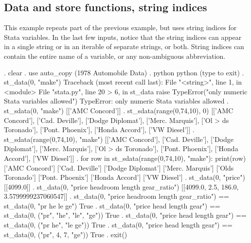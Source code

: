 \documentclass{article}
\begin{document}
\smallskip



\subsection{Data and store functions, string indices} \label{data_and_store_string_example}

This example repeats part of the previous example, but uses string indices for Stata variables. In the last few inputs, notice that the string indices can appear in a single string or in an iterable of separate strings, or both. String indices can contain the entire name of a variable, or any non-ambiguous abbreviation.

\begin{stlog}
. clear
{\smallskip}
. use auto_copy
(1978 Automobile Data)
{\smallskip}
. python
 python (type {} to exit) 
{\bftt{>>>}}. st_data(0, "make")
{\color{red}Traceback (most recent call last):
  File "<string>", line 1, in <module>
  File "stata.py", line 20
> 6, in st_data
    raise TypeError("only numeric Stata variables allowed")
TypeError: only numeric Stata variables allowed}
{\smallskip}
{\bftt{>>>}}. st_sdata(0, "make")
[['AMC Concord']]
{\smallskip}
{\bftt{>>>}}. st_sdata(range(0,74,10), 0)
[['AMC Concord'], ['Cad. Deville'], ['Dodge Diplomat'], ['Merc. Marquis'], ['Ol
> ds Toronado'], ['Pont. Phoenix'], ['Honda Accord'], ['VW Diesel']]
{\smallskip}
{\bftt{>>>}}. st_sdata(range(0,74,10), "make")
[['AMC Concord'], ['Cad. Deville'], ['Dodge Diplomat'], ['Merc. Marquis'], ['Ol
> ds Toronado'], ['Pont. Phoenix'], ['Honda Accord'], ['VW Diesel']]
{\smallskip}
{\bftt{>>>}}. for row in st_sdata(range(0,74,10), "make"): print(row)
['AMC Concord']
['Cad. Deville']
['Dodge Diplomat']
['Merc. Marquis']
['Olds Toronado']
['Pont. Phoenix']
['Honda Accord']
['VW Diesel']
{\smallskip}
{\bftt{>>>}}. st_data(0, "price")
[[4099.0]]
{\smallskip}
{\bftt{>>>}}. st_data(0, "price headroom length gear_ratio")
[[4099.0, 2.5, 186.0, 3.5799999237060547]]
{\smallskip}
{\bftt{>>>}}. st_data(0, "price headroom length gear_ratio") == st_data(0, "pr he le ge")
True
{\smallskip}
{\bftt{>>>}}. st_data(0, "price head length gear") == st_data(0, ("pr", "he", "le", "ge"))
True
{\smallskip}
{\bftt{>>>}}. st_data(0, "price head length gear") == st_data(0, ("pr he", "le ge"))
True
{\smallskip}
{\bftt{>>>}}. st_data(0, "price head length gear") == st_data(0, ("pr", 4, 7, "ge"))
True
{\smallskip}
{\bftt{>>>}}. exit()
\end{stlog}
\end{document}
